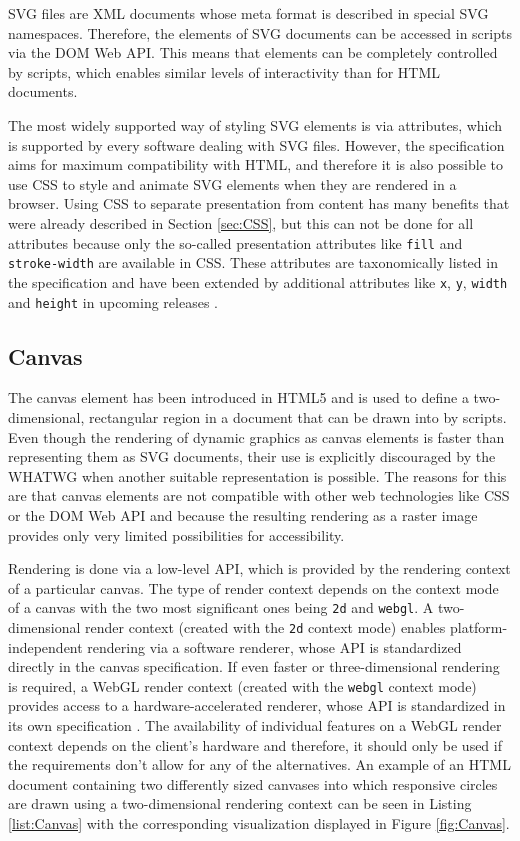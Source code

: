 SVG files are XML documents whose meta format is described in special SVG namespaces. Therefore, the elements of SVG documents can be accessed in scripts via the DOM Web API. This means that elements can be completely controlled by scripts, which enables similar levels of interactivity than for HTML documents.

The most widely supported way of styling SVG elements is via attributes, which is supported by every software dealing with SVG files. However, the specification aims for maximum compatibility with HTML, and therefore it is also possible to use CSS to style and animate SVG elements when they are rendered in a browser. Using CSS to separate presentation from content has many benefits that were already described in Section \ref{sec:CSS}, but this can not be done for all attributes because only the so-called presentation attributes like \lstinline{fill} and \lstinline{stroke-width} are available in CSS. These attributes are taxonomically listed in the specification \parencite{CSS1.1} and have been extended by additional attributes like \lstinline{x}, \lstinline{y}, \lstinline{width} and \lstinline{height} in upcoming releases \parencite{CSS2}.

\subsection{Canvas}

The canvas element has been introduced in HTML5 \parencite{HTMLSpec} and is used to define a two-dimensional, rectangular region in a document that can be drawn into by scripts. Even though the rendering of dynamic graphics as canvas elements is faster than representing them as SVG documents, their use is explicitly discouraged by the WHATWG when another suitable representation is possible. The reasons for this are that canvas elements are not compatible with other web technologies like CSS or the DOM Web API and because the resulting rendering as a raster image provides only very limited possibilities for accessibility.

Rendering is done via a low-level API, which is provided by the rendering context of a particular canvas. The type of render context depends on the context mode of a canvas with the two most significant ones being \lstinline{2d} and \lstinline{webgl}. A two-dimensional render context (created with the \lstinline{2d} context mode) enables platform-independent rendering via a software renderer, whose API is standardized directly in the canvas specification. If even faster or three-dimensional rendering is required, a WebGL render context (created with the \lstinline{webgl} context mode) provides access to a hardware-accelerated renderer, whose API is standardized in its own specification \parencite{WebGL}. The availability of individual features on a WebGL render context depends on the client's hardware and therefore, it should only be used if the requirements don't allow for any of the alternatives. An example of an HTML document containing two differently sized canvases into which responsive circles are drawn using a two-dimensional rendering context can be seen in Listing \ref{list:Canvas} with the corresponding visualization displayed in Figure \ref{fig:Canvas}.

